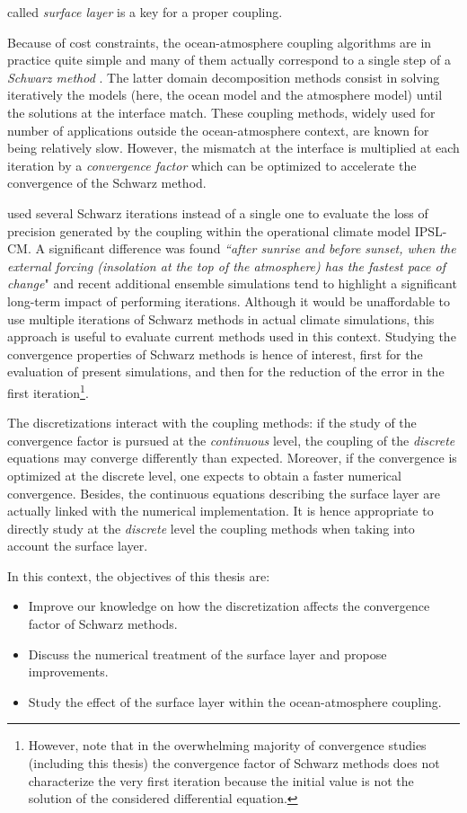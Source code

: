 called \textit{surface layer} is a key for a proper coupling.
\par %
Because of cost constraints, the ocean-atmosphere coupling algorithms
are in practice quite simple and many of them actually
correspond to a single step of a \textit{Schwarz method}
\citep{lemarie_analysis_2015}. The latter domain decomposition methods consist in solving
iteratively the models (here, the ocean model and the
atmosphere model) until the solutions at the interface match.
These coupling methods, widely used for number of applications
outside the ocean-atmosphere context, are known for being relatively
slow. However, the mismatch at the interface is multiplied
at each iteration by a \textit{convergence factor} which
can be optimized to accelerate the convergence of the
Schwarz method.
\par %
\citep{marti_schwarz_2021} used several Schwarz iterations
instead of a single one to evaluate the loss of precision
generated by the coupling within the operational climate model
IPSL-CM. A significant difference was found
\textit{``after sunrise
and before sunset, when the external forcing (insolation at
the top of the atmosphere) has the fastest pace of change}"
and recent additional ensemble simulations tend to highlight
a significant long-term impact of performing iterations.
Although it would be unaffordable to use multiple
iterations of Schwarz methods in actual climate simulations,
this approach is useful to evaluate current methods
used in this context.
Studying the convergence properties of Schwarz methods is
hence of interest, first for the evaluation of present simulations,
and then for the reduction of the
error in the first iteration\footnote{However, note that
in the overwhelming majority of convergence studies
(including this thesis) the convergence factor of
Schwarz methods does not characterize the very first iteration
because the initial value is not the solution of the
considered differential equation.}.
\par %
The discretizations interact with the coupling methods:
if the study of the convergence factor is pursued at the
\textit{continuous} level, the coupling of the \textit{discrete}
equations may converge differently than expected. Moreover,
if the convergence is optimized at the discrete level, one expects
to obtain a faster numerical convergence.
Besides, the continuous equations describing the surface
layer are actually linked with the numerical implementation.
It is hence appropriate to directly study at the \textit{discrete}
level the coupling methods when taking into account
the surface layer.
\par %
In this context, the objectives of this thesis are:
\begin{itemize}
\item Improve our knowledge on how the discretization affects
the convergence factor of Schwarz methods.
\item Discuss the numerical treatment of the surface layer and propose
	improvements.
\item Study the effect of the surface layer within
	the ocean-atmosphere coupling.
\end{itemize}
